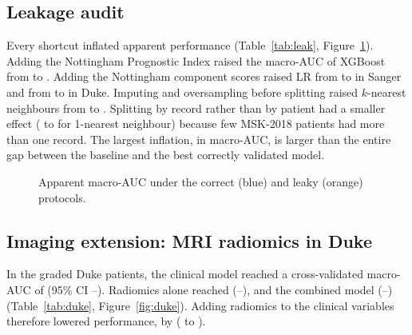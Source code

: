 \begin{table}[htbp]\centering\small
\caption{Clinical-plausibility check. ``Expected'' was pre-specified. Ordinal odds ratios are for
higher grade from a complete-case proportional-odds model (bootstrap 95\% CI).}\label{tab:shap}
\tabfit{}
\end{table}

\subsection{Leakage audit}
Every shortcut inflated apparent performance (Table~\ref{tab:leak}, Figure~\ref{fig:leak}). Adding the
Nottingham Prognostic Index raised the macro-AUC of XGBoost from \NpiHonest{} to \NpiLeaky. Adding the
Nottingham component scores raised LR from \CompHonest{} to \CompLeaky{} in Sanger and from
\CompHonestDuke{} to \CompLeakyDuke{} in Duke. Imputing and oversampling before splitting raised
$k$-nearest neighbours from \SmoteHonestKnn{} to \SmoteLeakyKnn. Splitting by record rather than by
patient had a smaller effect (\RecHonestKnn{} to \RecLeakyKnn{} for 1-nearest neighbour) because few
MSK-2018 patients had more than one record. The largest inflation, \LeakMaxInfl{} in macro-AUC, is
larger than the entire gap between the baseline and the best correctly validated model.

\begin{table}[htbp]\centering\small
\caption{Leakage audit: identical models evaluated with the correct and a leaky protocol (5-fold
cross-validation).}\label{tab:leak}
\tabfit{}
\end{table}

\begin{figure}[htbp]\centering
{}
\caption{Apparent macro-AUC under the correct (blue) and leaky (orange) protocols.}\label{fig:leak}
\end{figure}

\subsection{Imaging extension: MRI radiomics in Duke}
In the \NDukeRad{} graded Duke patients, the clinical model reached a cross-validated macro-AUC of
\DukeClinAuc{} (95\% CI \DukeClinAucLo--\DukeClinAucHi). Radiomics alone reached \DukeRadAuc{}
(\DukeRadAucLo--\DukeRadAucHi), and the combined model \DukeFusAuc{} (\DukeFusAucLo--\DukeFusAucHi)
(Table~\ref{tab:duke}, Figure~\ref{fig:duke}). Adding radiomics to the clinical variables therefore
lowered performance, by \DukeFusDelta{} (\DukeFusDeltaLo{} to \DukeFusDeltaHi).

